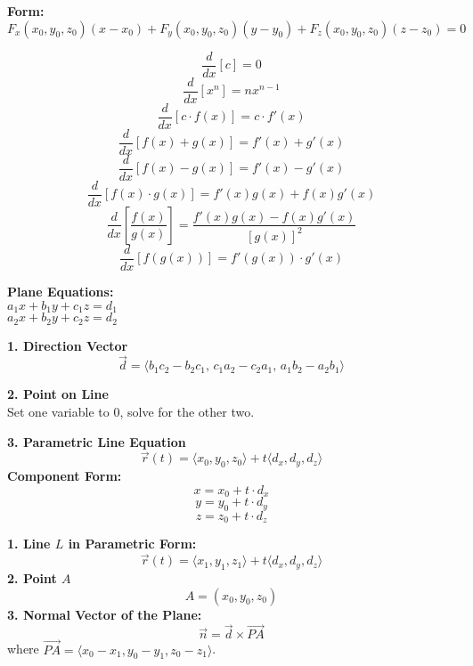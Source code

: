 \documentclass[2pt]{article}
\begin{document}
\begin{multicols}{2}
\begin{tcolorbox}[title=\textbf{Directional Derivative and Gradient Vector}, colframe=lightblue]
\end{tcolorbox}

\begin{tcolorbox}[title=\textbf{Tangent Planes and Surfaces}, colframe=lightblue]
    \textbf{Form:} 	
    \[ \scriptstyle F_x(x_0, y_0, z_0)(x - x_0) + F_y(x_0, y_0, z_0)(y - y_0) + F_z(x_0, y_0, z_0)(z - z_0) = 0  \]
\end{tcolorbox}

\begin{tcolorbox}[title=\textbf{Derivative Rules}, colframe=lightblue]
    \[ \frac{d}{dx} [c] = 0 \]
    \[ \frac{d}{dx} [x^n] = nx^{n-1} \]
    \[ \frac{d}{dx} [c \cdot f(x)] = c \cdot f'(x) \]
    \[ \frac{d}{dx} [f(x) + g(x)] = f'(x) + g'(x) \]
    \[ \frac{d}{dx} [f(x) - g(x)] = f'(x) - g'(x) \]
    \[ \frac{d}{dx} [f(x) \cdot g(x)] = f'(x) g(x) + f(x) g'(x) \]
    \[ \frac{d}{dx} \left[ \frac{f(x)}{g(x)} \right] = \frac{f'(x) g(x) - f(x) g'(x)}{[g(x)]^2} \]
    \[ \frac{d}{dx} [f(g(x))] = f'(g(x)) \cdot g'(x) \]
\end{tcolorbox}

\begin{tcolorbox}[title=\textbf{Intersection of Two Planes}, colframe=lightblue]
    \textbf{Plane Equations:} \\
    \( a_1 x + b_1 y + c_1 z = d_1 \) \\
    \( a_2 x + b_2 y + c_2 z = d_2 \) 

    \textbf{1. Direction Vector} \\
    \[
    \vec{d} = \langle b_1 c_2 - b_2 c_1, \, c_1 a_2 - c_2 a_1, \, a_1 b_2 - a_2 b_1 \rangle
    \]

    \textbf{2. Point on Line} \\
    Set one variable to 0, solve for the other two.

    \textbf{3. Parametric Line Equation} \\
    \[
    \vec{r}(t) = \langle x_0, y_0, z_0 \rangle + t \langle d_x, d_y, d_z \rangle
    \]
    \textbf{Component Form:} \\
    \[
    x = x_0 + t \cdot d_x
    \]
    \[
    y = y_0 + t \cdot d_y
    \]
    \[
    z = z_0 + t \cdot d_z
    \]

\end{tcolorbox}

\begin{tcolorbox}[title=\textbf{Plane Containing Line \( L \) and Point \( A \)}, colframe=lightblue]
    \textbf{1. Line \( L \) in Parametric Form:} \\
    \[
    \vec{r}(t) = \langle x_1, y_1, z_1 \rangle + t \langle d_x, d_y, d_z \rangle
    \]
    \textbf{2. Point \( A \)} \\
    \[
    A = (x_0, y_0, z_0)
    \]
    \textbf{3. Normal Vector of the Plane:} \\
    \[
    \vec{n} = \vec{d} \times \overrightarrow{PA}
    \]
    where \(\overrightarrow{PA} = \langle x_0 - x_1, y_0 - y_1, z_0 - z_1 \rangle \).


\end{tcolorbox}
\end{multicols}
\end{document}
